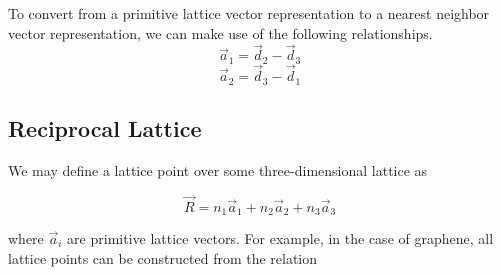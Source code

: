 \documentclass{article}
\begin{document}
To convert from a primitive lattice vector representation to a nearest neighbor vector representation, we can make use of the following
relationships.
$$\vec{a}_{1} = \vec{d}_{2} - \vec{d}_{3}$$
\begin{equation}
\vec{a}_{2} = \vec{d}_{3} - \vec{d}_{1}
\end{equation}

\subsection{Reciprocal Lattice}
We may define a lattice point over some three-dimensional lattice as

\begin{equation}
\vec{R} = n_{1}\vec{a}_{1} + n_{2}\vec{a}_{2} + n_{3}\vec{a}_{3}
\end{equation}

where $\vec{a}_{i}$ are primitive lattice vectors. For example, in the case of
graphene, all lattice points can be constructed from the relation
\end{document}

